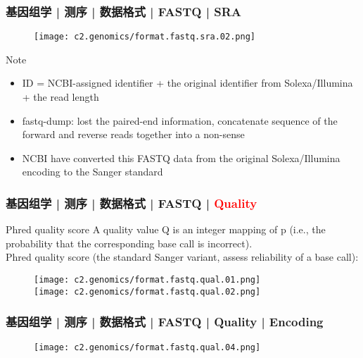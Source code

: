 \begin{frame}
  \frametitle{基因组学 | 测序 | 数据格式 | FASTQ | SRA}
  \begin{figure}
    \centering
    \texttt{[image: c2.genomics/format.fastq.sra.02.png]}
  \end{figure}
  \begin{block}{Note}
    \begin{itemize}
      \item ID = NCBI-assigned identifier + the original identifier from Solexa/Illumina + the read length
      \item fastq-dump: lost the paired-end information, concatenate sequence of the forward and reverse reads together into a non-sense
      \item NCBI have converted this FASTQ data from the original Solexa/Illumina encoding to the Sanger standard
    \end{itemize}
  \end{block}
\end{frame}
    
\begin{frame}
  \frametitle{基因组学 | 测序 | 数据格式 | FASTQ | \textcolor{red}{Quality}}
  \begin{block}{Phred quality score}
A quality value Q is an integer mapping of p (i.e., the probability that the corresponding base call is incorrect).\\
\vspace{1em}
Phred quality score (the standard Sanger variant, assess reliability of a base call): 
  \end{block}
  \begin{figure}
    \centering
    \texttt{[image: c2.genomics/format.fastq.qual.01.png]}\\
    \vspace{1em}
    \texttt{[image: c2.genomics/format.fastq.qual.02.png]}
  \end{figure}
\end{frame}
    
\begin{frame}
  \frametitle{基因组学 | 测序 | 数据格式 | FASTQ | Quality | Encoding}
  \begin{figure}
    \centering
    \texttt{[image: c2.genomics/format.fastq.qual.04.png]}
  \end{figure}
\end{frame}
    
